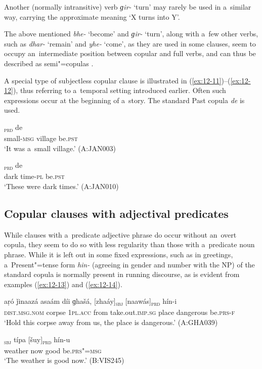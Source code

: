Another (normally intransitive) verb \textit{ɡir-} `turn' may rarely be used in a~similar way, carrying the approximate meaning `X turns into Y'.



The above mentioned \textit{bhe-} `become' and \textit{ɡir-} `turn', along with a~few other verbs, such as \textit{dhar-} `remain' and \textit{yhe-} `come', as they are used in some clauses, seem to occupy an~intermediate position between copular and full verbs, and can thus be described as semi"=copulas \citep[5--6]{pustet2003}. 



A special type of subjectless copular clause is illustrated in (\ref{ex:12-11})--(\ref{ex:12-12}), thus referring to a~temporal setting introduced earlier. Often such expressions occur at the beginning of a~story. The standard Past copula \textit{de} is used.

\begin{exe}
\ex
\label{ex:12-11}
\textsubscript{\textsc{prd}} de \\
small-\textsc{msg} village be.\textsc{pst} \\
\glt `It was a~small village.' (A:JAN003)
\end{exe}
\begin{exe}
\ex
\label{ex:12-12}
\textsubscript{\textsc{prd}} de \\
dark time-\textsc{pl} be.\textsc{pst} \\
\glt `These were dark times.' (A:JAN010)
\end{exe}

\subsection{Copular clauses with adjectival predicates}
\label{subsec:12-1-2}


While clauses with a~predicate adjective phrase do occur without an~overt copula, they seem to do so with less regularity than those with a~predicate noun phrase. While it is left out in some fixed expressions, such as in greetings, a~Present"=tense form \textit{hin-} (agreeing in gender and number with the NP) of the standard copula is normally present in running discourse, as is evident from examples (\ref{ex:12-13}) and (\ref{ex:12-14}). 

\begin{exe}
\ex
\label{ex:12-13}
\gll aṛó ǰinaazá asaám díi ɡhašá, [zhaáy]\textsubscript{\textsc{sbj}} [naawás]\textsubscript{\textsc{prd}} hín-i \\
\textsc{dist.msg.nom} corpse \textsc{1pl.acc} from take.out.\textsc{imp.sg}  place dangerous be.\textsc{prs-f} \\
\glt `Hold this corpse away from us, the place is dangerous.' (A:GHA039)
\end{exe}
\begin{exe}
\ex
\label{ex:12-14}
\gll [moosúm]\textsubscript{\textsc{sbj}} típa [šuy]\textsubscript{\textsc{prd}} hín-u \\
weather now good be.\textsc{prs"=msg} \\
\glt `The weather is good now.' (B:VIS245)
\end{exe}

